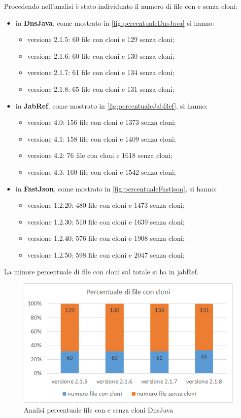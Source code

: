 Procedendo nell'analisi è stato individuato il numero di file con e senza cloni:
\begin{itemize}
	\item in \textbf{DnsJava}, come mostrato in \autoref{fig:percentualeDnsJava} si hanno:
	\begin{itemize}
		\item versione 2.1.5: 60 file con cloni e 129 senza cloni;
		\item versione 2.1.6: 60 file con cloni e 130 senza cloni;
		\item versione 2.1.7: 61 file con cloni e 134 senza cloni;
		\item versione 2.1.8: 65 file con cloni e 131 senza cloni;
	\end{itemize}
	\item in \textbf{JabRef}, come mostrato in \autoref{fig:percentualeJabRef}, si hanno:
	\begin{itemize}
		\item versione 4.0: 156 file con cloni e 1373 senza cloni;
		\item versione 4.1: 158 file con cloni e 1409 senza cloni;
		\item versione 4.2: 76 file con cloni e 1618 senza cloni;
		\item versione 4.3: 160 file con cloni e 1542 senza cloni;
	\end{itemize}
		\item in \textbf{FastJson}, come mostrato in \autoref{fig:percentualeFastjson}, si hanno:
	\begin{itemize}
		\item versione 1.2.20: 480 file con cloni e 1473 senza cloni;
		\item versione 1.2.30: 510 file con cloni e 1639 senza cloni;
		\item versione 1.2.40: 576 file con cloni e 1908 senza cloni;
		\item versione 1.2.50: 598 file con cloni e 2047 senza cloni;
	\end{itemize}
\end{itemize}
La minore percentuale di file con cloni sul totale si ha in jabRef.
\begin{figure}[h]
	\centering
	\includegraphics[scale=0.75, trim = 0cm 0cm 0cm 0cm, clip=true]{Grafici_dnsJava/PercentualeFileCloni.png}
	\caption{Analisi percentuale file con e senza cloni DnsJava}
	\label{fig:percentualeDnsJava}	
\end{figure}
